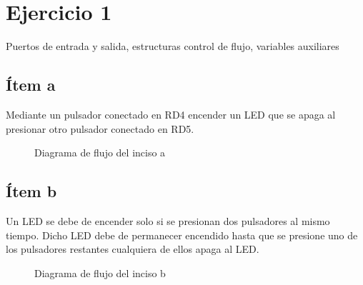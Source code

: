 \documentclass[12pt,a4paper]{article}
\begin{document}
\newpage
{} %

\tableofcontents{} %

\listoffigures %

\listoftables %

\newpage
{}
\section*{Ejercicio 1} 
Puertos de entrada y salida, estructuras control de flujo, variables auxiliares

\subsection*{Ítem a} Mediante un pulsador conectado en RD4 encender un LED que se apaga al presionar otro
pulsador conectado en RD5.



\begin{figure} [H] %
	\centering
\caption{Diagrama de flujo del inciso a}
\label{fig:inciso_a}
\end{figure}

	
\subsection*{Ítem b} Un LED se debe de encender solo si se presionan dos pulsadores al mismo tiempo. Dicho
LED debe de permanecer encendido hasta que se presione uno de los pulsadores restantes
cualquiera de ellos apaga al LED.



\begin{figure} [H] %
	\centering
	\caption{Diagrama de flujo del inciso b}
	\label{fig:inciso_b}
\end{figure}
\end{document}
